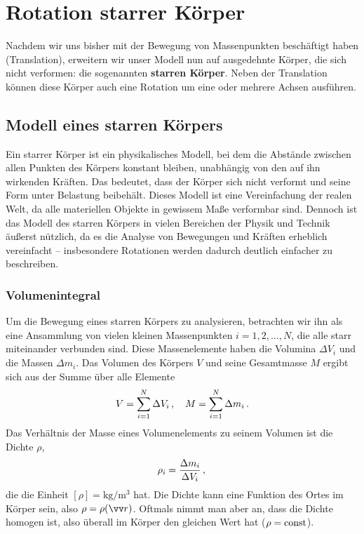 \chapter{Rotation starrer Körper}\label{chap: rotation_starrer_koerper}
Nachdem wir uns bisher mit der Bewegung von Massenpunkten beschäftigt haben (Translation), erweitern wir unser Modell nun auf ausgedehnte Körper, die sich nicht verformen: die sogenannten \textbf{starren Körper}. Neben der Translation können diese Körper auch eine Rotation um eine oder mehrere Achsen ausführen.

\section{Modell eines starren Körpers}\label{sec: model_starrer_koerper}
Ein starrer Körper ist ein physikalisches Modell, bei dem die Abstände zwischen allen Punkten des Körpers konstant bleiben, unabhängig von den auf ihn wirkenden Kräften. Das bedeutet, dass der Körper sich nicht verformt und seine Form unter Belastung beibehält. Dieses Modell ist eine Vereinfachung der realen Welt, da alle materiellen Objekte in gewissem Maße verformbar sind. Dennoch ist das Modell des starren Körpers in vielen Bereichen der Physik und Technik äußerst nützlich, da es die Analyse von Bewegungen und Kräften erheblich vereinfacht -- insbesondere Rotationen werden dadurch deutlich einfacher zu beschreiben.

\subsection{Volumenintegral}
Um die Bewegung eines starren Körpers zu analysieren, betrachten wir ihn als eine Ansammlung von vielen kleinen Massenpunkten $i = 1,2,\ldots,N$, die alle starr miteinander verbunden sind. Diese Massenelemente haben die Volumina $\Delta V_i$ und die Massen $\Delta m_i$. Das Volumen des Körpers $V$ und seine Gesamtmasse $M$ ergibt sich aus der Summe über alle Elemente 
\begin{equation}\label{eq: volumen_masse_endlicheTeile_starrer_koerper}
    V = \sum_{i=1}^{N} \Delta V_i \,{,}\, \quad M = \sum_{i=1}^{N} \Delta m_i \,.
\end{equation}
Das Verhältnis der Masse eines Volumenelements zu seinem Volumen ist die Dichte $\rho$,
\begin{equation}\label{eq: dichte_starrer_koerper}
    \rho_i = \frac{\Delta m_i}{\Delta V_i} \,{,}\,
\end{equation}
die die Einheit $[\rho] = \si{\kilogram\per\meter^{3}}$ hat. Die Dichte kann eine Funktion des Ortes im Körper sein, also $\rho = \rho(\ivec{r})$. Oftmals nimmt man aber an, dass die Dichte homogen ist, also überall im Körper den gleichen Wert hat ($\rho = \mathrm{const}$). 

